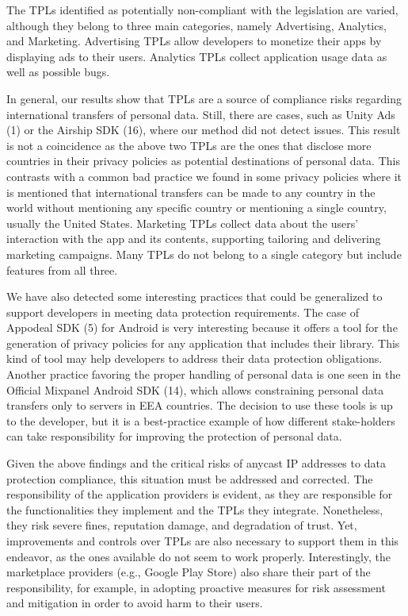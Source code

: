 \documentclass{article}
\begin{document}
The TPLs identified as potentially non-compliant with the legislation are varied, although they belong to three main categories, namely Advertising, Analytics, and Marketing. Advertising TPLs allow developers to monetize their apps by displaying ads to their users. Analytics TPLs collect application usage data as well as possible bugs.

In general, our results show that TPLs are a source of compliance risks regarding international transfers of personal data. Still, there are cases, such as Unity Ads (1) or the Airship SDK (16), where our method did not detect issues. This result is not a coincidence as the above two TPLs are the ones that disclose more countries in their privacy policies as potential destinations of personal data. This contrasts with a common bad practice we found in some privacy policies where it is mentioned that international transfers can be made to any country in the world without mentioning any specific country or mentioning a single country, usually the United States. Marketing TPLs collect data about the users' interaction with the app and its contents, supporting tailoring and delivering marketing campaigns. Many TPLs do not belong to a single category but include features from all three.

We have also detected some interesting practices that could be generalized to support developers in meeting data protection requirements. The case of Appodeal SDK (5) for Android is very interesting because it offers a tool for the generation of privacy policies for any application that includes their library. This kind of tool may help developers to address their data protection obligations. Another practice favoring the proper handling of personal data is one seen in the Official Mixpanel Android SDK (14), which allows constraining personal data transfers only to servers in EEA countries. The decision to use these tools is up to the developer, but it is a best-practice example of how different stake-holders can take responsibility for improving the protection of personal data.

Given the above findings and the critical risks of anycast IP addresses to data protection compliance, this situation must be addressed and corrected. The responsibility of the application providers is evident, as they are responsible for the functionalities they implement and the TPLs they integrate. Nonetheless, they risk severe fines, reputation damage, and degradation of trust. Yet, improvements and controls over TPLs are also necessary to support them in this endeavor, as the ones available do not seem to work properly. Interestingly, the marketplace providers (e.g., Google Play Store) also share their part of the responsibility, for example, in adopting proactive measures for risk assessment and mitigation in order to avoid harm to their users.
\end{document}
